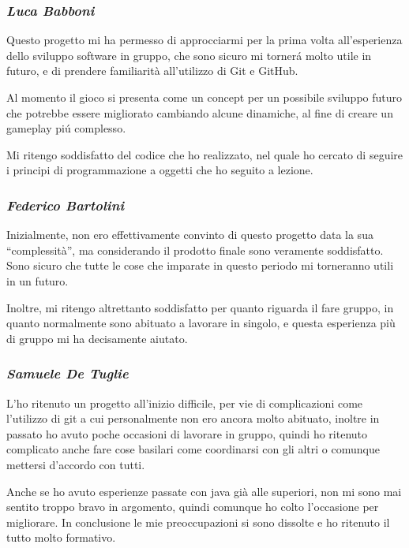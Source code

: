 \documentclass[a4paper,titlepage,12pt]{article}
\begin{document}
\subsubsection*{\large \slshape Luca Babboni}
\par \noindent Questo progetto mi ha permesso di approcciarmi per la prima volta all’esperienza dello sviluppo software in gruppo, che sono sicuro mi tornerá molto utile in futuro, e di prendere familiarità all'utilizzo di Git e GitHub. 
\par \noindent Al momento il gioco si presenta come un concept per un possibile sviluppo futuro che potrebbe essere migliorato cambiando alcune dinamiche, al fine di creare un gameplay piú complesso. 
\par \noindent Mi ritengo soddisfatto del codice che ho realizzato, nel quale ho cercato di seguire i principi di programmazione a oggetti che ho seguito  a lezione. 


\subsubsection*{\large \slshape Federico Bartolini}
\par \noindent Inizialmente, non ero effettivamente convinto di questo progetto data la sua “complessità”, ma considerando il prodotto finale sono veramente soddisfatto. Sono sicuro che tutte le cose che imparate in questo periodo mi torneranno utili in un futuro.
\par \noindent Inoltre, mi ritengo altrettanto soddisfatto per quanto riguarda il fare gruppo, in quanto normalmente sono abituato a lavorare in singolo, e questa esperienza più di gruppo mi ha decisamente aiutato.

\subsubsection*{\large \slshape Samuele De Tuglie}
\par \noindent L’ho ritenuto un progetto all’inizio difficile, per vie di complicazioni come l’utilizzo di git a cui personalmente non ero ancora molto abituato, inoltre in passato ho avuto poche occasioni di lavorare in gruppo, quindi ho ritenuto complicato anche fare cose basilari come coordinarsi con gli altri o comunque mettersi d’accordo con tutti. 
\par \noindent Anche se ho avuto esperienze passate con java già alle superiori, non mi sono mai sentito troppo bravo in argomento, quindi comunque ho colto l’occasione per migliorare. 
In conclusione le mie preoccupazioni si sono dissolte e ho ritenuto il tutto molto formativo.
\end{document}
